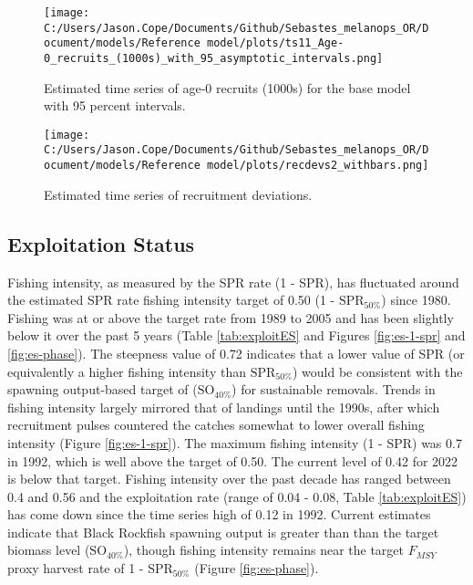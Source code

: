 \documentclass[11pt,
  english,
  letterpaper,
]{article}
\begin{document}


\begin{figure}
\centering
\texttt{[image: C:/Users/Jason.Cope/Documents/Github/Sebastes\_melanops\_OR/Document/models/Reference model/plots/ts11\_Age-0\_recruits\_(1000s)\_with\_95\_asymptotic\_intervals.png]}
\caption{Estimated time series of age-0 recruits (1000s) for the base model with 95 percent intervals.\label{fig:es-recruits}}
\end{figure}

\begin{figure}
\centering
\texttt{[image: C:/Users/Jason.Cope/Documents/Github/Sebastes\_melanops\_OR/Document/models/Reference model/plots/recdevs2\_withbars.png]}
\caption{Estimated time series of recruitment deviations.\label{fig:es-recdev}}
\end{figure}

\hypertarget{exploitation-status}{%
\subsection*{Exploitation Status}\label{exploitation-status}}

Fishing intensity, as measured by the SPR rate (1 - SPR), has fluctuated around the estimated SPR rate fishing intensity target of 0.50 (1 - \(\text{SPR}_{50\%}\)) since 1980. Fishing was at or above the target rate from 1989 to 2005 and has been slightly below it over the past 5 years (Table \ref{tab:exploitES} and Figures \ref{fig:es-1-spr} and \ref{fig:es-phase}). The steepness value of 0.72 indicates that a lower value of SPR (or equivalently a higher fishing intensity than \(\text{SPR}_{50\%}\)) would be consistent with the spawning output-based target of (\(\text{SO}_{40\%}\)) for sustainable removals. Trends in fishing intensity largely mirrored that of landings until the 1990s, after which recruitment pulses countered the catches somewhat to lower overall fishing intensity (Figure \ref{fig:es-1-spr}). The maximum fishing intensity (1 - SPR) was 0.7 in 1992, which is well above the target of 0.50. The current level of 0.42 for 2022 is below that target. Fishing intensity over the past decade has ranged between 0.4 and 0.56 and the exploitation rate (range of 0.04 - 0.08, Table \ref{tab:exploitES}) has come down since the time series high of 0.12 in 1992. Current estimates indicate that Black Rockfish spawning output is greater than than the target biomass level (\(\text{SO}_{40\%}\)), though fishing intensity remains near the target \(F_{MSY}\) proxy harvest rate of 1 - \(\text{SPR}_{50\%}\) (Figure \ref{fig:es-phase}).
\end{document}
